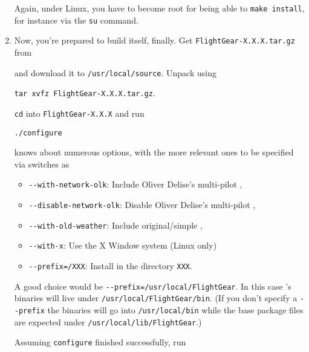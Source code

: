 \begin{enumerate}
 \noindent
 Again, under Linux, you have to become root for being able to \texttt{make
install}, for instance via the \texttt{su} command.

\item Now, you're prepared to build \FlightGear{} itself, finally.
 Get \texttt{FlightGear-X.X.X.tar.gz} from
  \medskip

  \medskip

 \noindent
and download it to \texttt{/usr/local/source}. Unpack \FlightGear{} using
 \medskip

        \texttt{tar xvfz FlightGear-X.X.X.tar.gz}.
 \medskip

\texttt{cd} into \texttt{FlightGear-X.X.X} and run

        \texttt{./configure}
 \medskip

 knows about numerous options,  with the more
relevant ones to be specified via switches as

\begin{itemize}
\item{\texttt{-$ $-with-network-olk}}:      Include Oliver Delise's multi-pilot ,

\item{\texttt{-$ $-disable-network-olk}}:   Disable Oliver Delise's multi-pilot ,

\item{\texttt{-$ $-with-old-weather}}:     Include original/simple ,

\item{\texttt{-$ $-with-x}}:       Use the X Window  system (Linux only)\\

\item{\texttt{-$ $-prefix=/XXX}}: Install \FlightGear{} in the directory \texttt{XXX}.
\end{itemize}

A good choice would be \texttt{-$ $-prefix=/usr/local/FlightGear}. In this case
\FlightGear{}'s binaries will live under
\texttt{/usr/local/FlightGear/bin}. (If you don't specify a \texttt{-$ $-prefix} the binaries will go into \texttt{/usr/local/bin} while the base package files are expected under \texttt{/usr/local/lib/FlightGear}.)

Assuming \texttt{configure} finished successfully, run
 \medskip


\end{enumerate}
